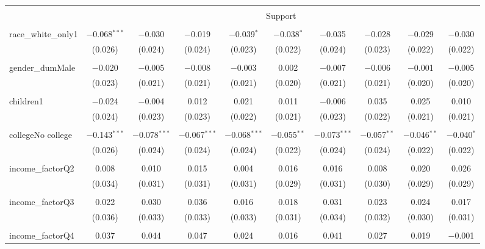 
\begin{tabular}{@{\extracolsep{5pt}}lccccccccc} 
\\[-1.8ex]\hline 
\hline \\[-1.8ex] 
 & \multicolumn{9}{c}{Support} \\ 
\cline{2-10} 
\hline \\[-1.8ex] 
 race\_white\_only1 & $-$0.068$^{***}$ & $-$0.030 & $-$0.019 & $-$0.039$^{*}$ & $-$0.038$^{*}$ & $-$0.035 & $-$0.028 & $-$0.029 & $-$0.030 \\ 
  & (0.026) & (0.024) & (0.024) & (0.023) & (0.022) & (0.024) & (0.023) & (0.022) & (0.022) \\ 
  & & & & & & & & & \\ 
 gender\_dumMale & $-$0.020 & $-$0.005 & $-$0.008 & $-$0.003 & 0.002 & $-$0.007 & $-$0.006 & $-$0.001 & $-$0.005 \\ 
  & (0.023) & (0.021) & (0.021) & (0.021) & (0.020) & (0.021) & (0.021) & (0.020) & (0.020) \\ 
  & & & & & & & & & \\ 
 children1 & $-$0.024 & $-$0.004 & 0.012 & 0.021 & 0.011 & $-$0.006 & 0.035 & 0.025 & 0.010 \\ 
  & (0.024) & (0.023) & (0.023) & (0.022) & (0.021) & (0.023) & (0.022) & (0.021) & (0.021) \\ 
  & & & & & & & & & \\ 
 collegeNo college & $-$0.143$^{***}$ & $-$0.078$^{***}$ & $-$0.067$^{***}$ & $-$0.068$^{***}$ & $-$0.055$^{**}$ & $-$0.073$^{***}$ & $-$0.057$^{**}$ & $-$0.046$^{**}$ & $-$0.040$^{*}$ \\ 
  & (0.026) & (0.024) & (0.024) & (0.024) & (0.022) & (0.024) & (0.024) & (0.022) & (0.022) \\ 
  & & & & & & & & & \\ 
 income\_factorQ2 & 0.008 & 0.010 & 0.015 & 0.004 & 0.016 & 0.016 & 0.008 & 0.020 & 0.026 \\ 
  & (0.034) & (0.031) & (0.031) & (0.031) & (0.029) & (0.031) & (0.030) & (0.029) & (0.029) \\ 
  & & & & & & & & & \\ 
 income\_factorQ3 & 0.022 & 0.030 & 0.036 & 0.016 & 0.018 & 0.031 & 0.023 & 0.024 & 0.017 \\ 
  & (0.036) & (0.033) & (0.033) & (0.033) & (0.031) & (0.034) & (0.032) & (0.030) & (0.031) \\ 
  & & & & & & & & & \\ 
 income\_factorQ4 & 0.037 & 0.044 & 0.047 & 0.024 & 0.016 & 0.041 & 0.027 & 0.019 & $-$0.001 \\ 

\end{tabular}
